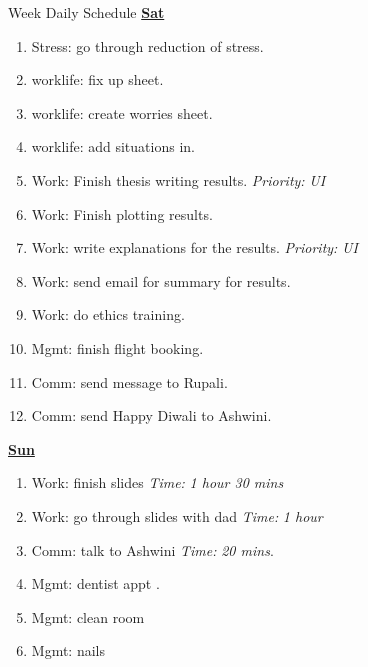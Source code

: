 \documentclass[serif, mathserif, final]{beamer}
\newcommand{\timeEst}[1]{\textit{Time:} \textit{#1}}
\newcommand{\priority}[1]{\textit{Priority:} \textit{#1}}
\begin{document}
\begin{frame}{}
\begin{columns}
\begin{column}{0.50\linewidth}
\begin{block}{Week Daily Schedule}
  \textbf{\small \underline{Sat}} 
  \begin{enumerate} 
    \tiny \item \tiny Stress: go through reduction of stress. 
  \item \tiny worklife: fix up sheet. 
  \item \tiny worklife: create worries sheet. 
  \item \tiny worklife: add situations in. 
\item \tiny Work: Finish thesis writing results. \priority{UI}
\item \tiny Work: Finish plotting results. 
\item \tiny Work: write explanations for the results. \priority{UI} 
\item \tiny Work: send email for summary for results. 
\item \tiny Work: do ethics training.  
\item \tiny Mgmt: finish flight booking. 
\item \tiny Comm: send message to Rupali. 
\item \tiny Comm: send Happy Diwali to Ashwini. 
\end{enumerate} 

\textbf{\small \underline{Sun}}
\begin{enumerate} 
\tiny \item \tiny Work: finish slides \timeEst{1 hour 30 mins} 
\item \tiny Work: go through slides with dad \timeEst{1 hour} 
\item \tiny Comm: talk to Ashwini \timeEst{20 mins}. 
\item \tiny Mgmt: dentist appt .
\item \tiny Mgmt: clean room 
\item \tiny Mgmt: nails 

\end{enumerate} 

\end{block} 
\end{column}%



\end{columns}
\end{frame}
\end{document}
